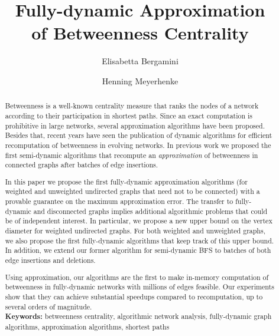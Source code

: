 \documentclass[english]{llncs}
\begin{document}
\author{Elisabetta Bergamini \and Henning Meyerhenke}

\title{Fully-dynamic Approximation \\ of Betweenness Centrality}

\date{}

\maketitle

\begin{abstract}
Betweenness is a well-known centrality measure that ranks the nodes of a network according to their participation in shortest paths.
Since an exact computation is prohibitive in large networks, several approximation algorithms have been proposed. Besides that, recent years
have seen the publication of dynamic algorithms for efficient recomputation of betweenness in evolving networks. In previous work  we
proposed the first semi-dynamic algorithms that recompute an \emph{approximation} of betweenness in connected graphs after batches of edge insertions. 

In this paper we propose the first fully-dynamic approximation algorithms (for weighted and unweighted undirected graphs that need not to be connected) with a provable guarantee on the maximum approximation error.
The transfer to fully-dynamic and disconnected graphs implies additional algorithmic problems that could be of independent interest. In particular, we propose a new upper bound on the vertex diameter for weighted undirected graphs. For both weighted and unweighted graphs, we also propose the first fully-dynamic algorithms that keep track of this upper bound.
In addition, we extend our former algorithm for semi-dynamic BFS to batches of both edge insertions and deletions. 

Using approximation, our algorithms are the first to make in-memory computation of betweenness in fully-dynamic networks with millions of edges feasible. Our experiments show that they can achieve substantial speedups compared to recomputation, up to 
several orders of magnitude.\\[0.25ex]
\noindent \textbf{Keywords:}  betweenness centrality, algorithmic network analysis, fully-dynamic graph algorithms, approximation algorithms, shortest paths
\end{abstract}
\end{document}

